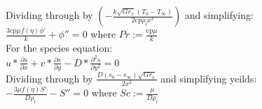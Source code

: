 \documentclass[letterpaper, 10pt]{article}
\begin{document}
Dividing through by $\left(-\frac{k \sqrt{Gr_x} (T_0-T_\infty)}{2 \text{cp} \rho_l x^2}\right)$ and simplifying:\\
$\frac{3 \text{cp} \mu  f(\eta ) \phi'}{k}+\phi'' = 0$ where $Pr := \frac{\text{cp} \mu}{k}$\\

For the species equation:\\
$u*\frac{\partial s}{\partial x}+v*\frac{\partial s}{\partial y}-D*\frac{\partial^2 s}{\partial y^2} = 0$\\

Dividing through by $\frac{D(s_0-s_\infty)\sqrt{Gr_x}}{2 x^2}$ and simplifying yeilds:\\
$-\frac{3 \mu  f(\eta ) S'}{D \rho_l}-S'' = 0$ where $Sc := \frac{\mu}{D \rho_l} $\\
\end{document}
